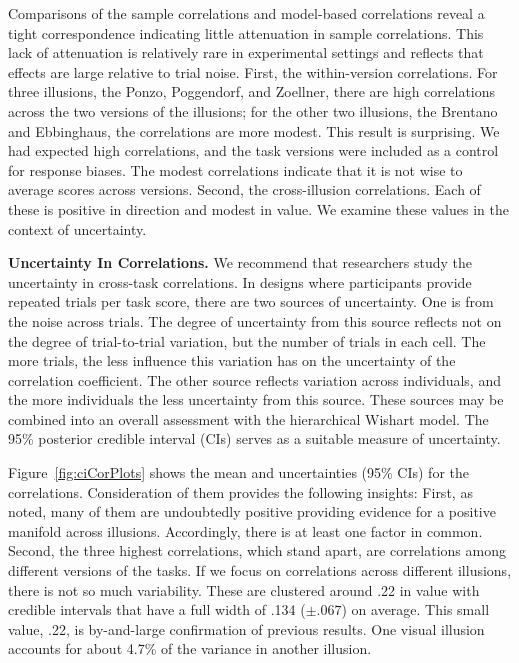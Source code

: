 \documentclass[man, 12pt]{apa7} %
\begin{document}
Comparisons of the sample correlations and model-based correlations reveal a tight correspondence indicating little attenuation in sample correlations.  This lack of attenuation is relatively rare in experimental settings and reflects that effects are large relative to trial noise.  First, the within-version correlations.  For three illusions, the Ponzo, Poggendorf, and Zoellner, there are high correlations across the two versions of the illusions; for the other two illusions, the Brentano and Ebbinghaus, the correlations are more modest.  This result is surprising.   We had expected high correlations, and the task versions were included as a control for response biases.  The modest correlations indicate that it is not wise to average scores across versions.  Second, the cross-illusion correlations.  Each of these is positive in direction and modest in value.  We examine these values in the context of uncertainty.

{\bf Uncertainty In Correlations.}  We recommend that researchers study the uncertainty in cross-task correlations.  In designs where participants provide repeated trials per task score, there are two sources of uncertainty.  One is from the noise across trials.  The degree of uncertainty from this source reflects not on the degree of trial-to-trial variation, but the number of trials in each cell.  The more trials, the less influence this variation has on the uncertainty of the correlation coefficient.  The other source reflects variation across individuals, and the more individuals the less uncertainty from this source. These sources may be combined into an overall assessment with the hierarchical Wishart model.  The 95\% posterior credible interval (CIs) serves as a suitable measure of uncertainty.  

Figure~\ref{fig:ciCorPlots} shows the mean and uncertainties (95\% CIs) for the correlations.  Consideration of them provides the following insights:  First, as noted, many of them are undoubtedly positive providing evidence for a positive manifold across illusions.  Accordingly, there is at least one factor in common.  Second, the three highest correlations, which stand apart, are correlations among different versions of the tasks.  If we focus on correlations across different illusions, there is not so much variability.  These are clustered around .22 in value with credible intervals that have a full width of .134 ($\pm .067$) on average.  This small value, .22, is by-and-large confirmation of previous results.  One visual illusion accounts for about 4.7\% of the variance in another illusion. 
\end{document}
